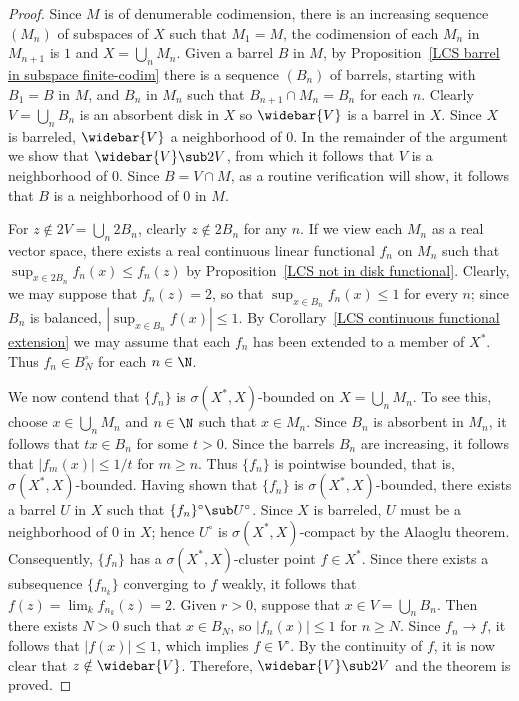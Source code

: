 \begin{proof}
Since $M$ is of denumerable codimension, there is an increasing sequence $(M_n)$ of subspaces of $X$ such that $M_1=M$, the codimension of each $M_n$ in $M_{n+1}$ is $1$ and $X=\bigcup_nM_n$. Given a barrel $B$ in $M$, by Proposition~\ref{LCS barrel in subspace finite-codim} there is a sequence $(B_n)$ of barrels, starting with $B_1=B$ in $M$, and $B_n$ in $M_n$ such that $B_{n+1}\cap M_n=B_n$ for each $n$. Clearly $V=\bigcup_nB_n$ is an absorbent disk in $X$ so $\widebar{V}$ is a barrel in $X$. Since $X$ is barreled, $\widebar{V}$ a neighborhood of $0$. In the remainder of the argument we show that $\widebar{V}\sub 2V$, from which it follows that $V$ is a neighborhood of $0$. Since $B=V\cap M$, as a routine verification will show, it follows that $B$ is a neighborhood of $0$ in $M$.\par
For $z\notin 2V=\bigcup_n2B_n$, clearly $z\notin 2B_n$ for any $n$. If we view each $M_n$ as a real vector space, there exists a real continuous linear functional $f_n$ on $M_n$ such that $\sup_{x\in 2B_n}f_n(x)\leq f_n(z)$ by Proposition~\ref{LCS not in disk functional}. Clearly, we may suppose that $f_n(z)=2$, so that $\sup_{x\in B_n}f_n(x)\leq 1$ for every $n$; since $B_n$ is balanced, $|\sup_{x\in B_n}f(x)|\leq 1$. By Corollary~\ref{LCS continuous functional extension} we may assume that each $f_n$ has been extended to a member of $X^*$. Thus $f_n\in B_N^\circ$ for each $n\in\N$.\par
We now contend that $\{f_n\}$ is $\sigma(X^*,X)$-bounded on $X=\bigcup_nM_n$. To see this, choose $x\in\bigcup_nM_n$ and $n\in\N$ such that $x\in M_n$. Since $B_n$ is absorbent in $M_n$, it follows that $tx\in B_n$ for some $t>0$. Since the barrels $B_n$ are increasing, it follows that $|f_m(x)|\leq 1/t$ for $m\geq n$. Thus $\{f_n\}$ is pointwise bounded, that is, $\sigma(X^*,X)$-bounded. Having shown that $\{f_n\}$ is $\sigma(X^*,X)$-bounded, there exists a barrel $U$ in $X$ such that $\{f_n\}^\circ\sub U^\circ$. Since $X$ is barreled, $U$ must be a neighborhood of $0$ in $X$; hence $U^\circ$ is $\sigma(X^*,X)$-compact by the Alaoglu theorem. Consequently, $\{f_n\}$ has a $\sigma(X^*,X)$-cluster point $f\in X^*$. Since there exists a subsequence $\{f_{n_k}\}$ converging to $f$ weakly, it follows that $f(z)=\lim_kf_{n_k}(z)=2$. Given $r>0$, suppose that $x\in V=\bigcup_nB_n$. Then there exists $N>0$ such that $x\in B_N$, so $|f_n(x)|\leq 1$ for $n\geq N$. Since $f_n\to f$, it follows that $|f(x)|\leq 1$, which implies $f\in V^\circ$. By the continuity of $f$, it is now clear that $z\notin\widebar{V}$. Therefore, $\widebar{V}\sub 2V$ and the theorem is proved.
\end{proof}

